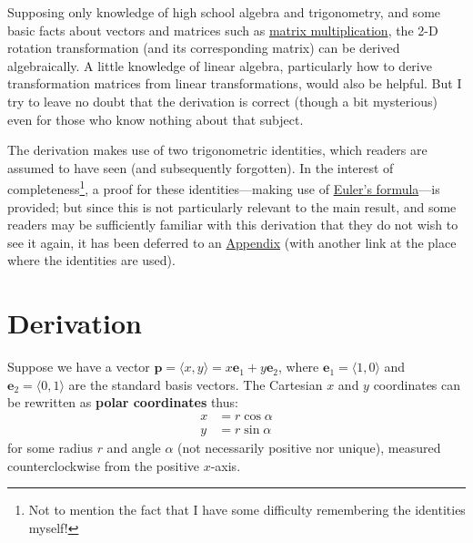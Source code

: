 \documentclass[11pt]{article}
\renewcommand{\vec}[1]{\mathbf{#1}}
\newcommand{\e}[1]{\mathbf{e}_{#1}}
\begin{document}
Supposing only knowledge of high school algebra and trigonometry, and
some basic facts about vectors and matrices such as \href{https://en.wikipedia.org/wiki/Matrix_multiplication}{matrix
multiplication}, the 2-D rotation transformation (and its corresponding
matrix) can be derived algebraically.  A little knowledge of linear
algebra, particularly how to derive transformation matrices from
linear transformations, would also be helpful.  But I try to leave no
doubt that the derivation is correct (though a bit mysterious) even
for those who know nothing about that subject.

The derivation makes use of two trigonometric identities, which
readers are assumed to have seen (and subsequently forgotten).  In the
interest of completeness\footnote{Not to mention the fact that I have some difficulty remembering
the identities myself!}, a proof for these identities---making
use of \href{https://en.wikipedia.org/wiki/Euler\%2527s_formula}{Euler's formula}---is provided; but since this is not
particularly relevant to the main result, and some readers may be
sufficiently familiar with this derivation that they do not wish to
see it again, it has been deferred to an \hyperref[sec-3]{Appendix} (with another link
at the place where the identities are used).

\section*{Derivation}
\label{sec-2}

Suppose we have a vector $\vec{p} = \langle x, y \rangle = x\e{1} +
y\e{2}$, where $\e{1} = \langle 1, 0 \rangle$ and $\e{2} = \langle 0,
1 \rangle$ are the standard basis vectors.  The Cartesian $x$ and $y$
coordinates can be rewritten as \textbf{polar coordinates} thus:
\begin{align*}
x &= r \cos \alpha \\
y &= r \sin \alpha\tag{1}
\end{align*}
for some radius $r$ and angle $\alpha$ (not necessarily positive nor
unique), measured counterclockwise from the positive $x$-axis.
\end{document}

